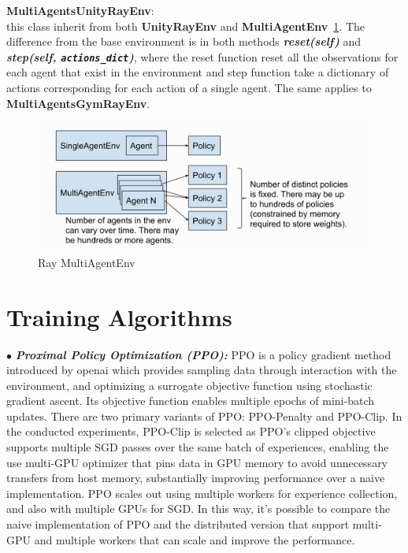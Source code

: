 \textbf{MultiAgentsUnityRayEnv}:\\
this class inherit from both \colorbox{gray!20}{\textbf{UnityRayEnv}} and \colorbox{gray!20}{\textbf{MultiAgentEnv}}~\ref{fig:ray_multiagentenv}. The difference from the base environment is in both methods \textit{\textbf{\colorbox{gray!20}{reset(self)}}} and \textit{\textbf{\colorbox{gray!20}{step(self, \texttt{actions\_dict})}}}, where the reset function reset all the observations for each agent that exist in the environment and step function take a dictionary of actions corresponding for each action of a single agent. The same applies to \textbf{MultiAgentsGymRayEnv}.

\begin{figure}[!htb]
		\centering
		\includegraphics[width=\linewidth]{figures/architecture/ray_multiagentenv.png}
		\caption{Ray MultiAgentEnv}
		\label{fig:ray_multiagentenv}
\end{figure}

\section{Training Algorithms}

$\bullet$ \textit{\textbf{Proximal Policy Optimization (PPO):}} PPO is a policy gradient method introduced by openai which provides sampling data through interaction with the environment, and optimizing a surrogate objective function using stochastic gradient ascent. Its objective function enables multiple epochs of mini-batch updates. There are two primary variants of PPO: PPO-Penalty and PPO-Clip. In the conducted experiments, PPO-Clip is selected as PPO’s clipped objective supports multiple SGD passes over the same batch of experiences, enabling the use multi-GPU optimizer that pins data in GPU memory to avoid unnecessary transfers from host memory, substantially improving performance over a naive implementation. PPO scales out using multiple workers for experience collection, and also with multiple GPUs for SGD. In this way, it's possible to compare the naive implementation of PPO and the distributed version that support multi-GPU and multiple workers that can scale and improve the performance.

